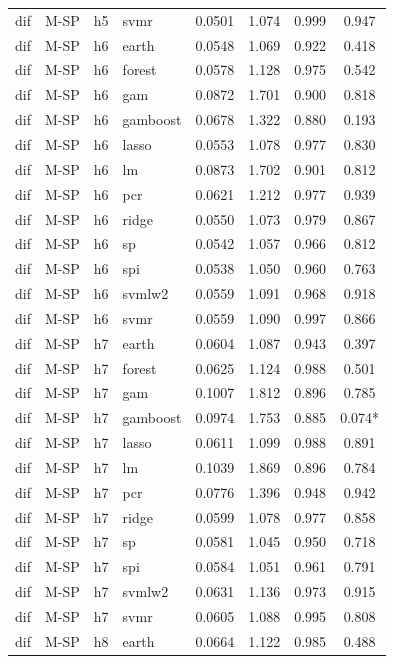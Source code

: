 \begin{ThreePartTable}
\begin{longtable}[t]{llclcccc}
dif & M-SP & h5 & svmr & 0.0501 & 1.074 & 0.999 & 0.947\\
\addlinespace
dif & M-SP & h6 & earth & 0.0548 & 1.069 & 0.922 & 0.418\\
dif & M-SP & h6 & forest & 0.0578 & 1.128 & 0.975 & 0.542\\
dif & M-SP & h6 & gam & 0.0872 & 1.701 & 0.900 & 0.818\\
dif & M-SP & h6 & gamboost & 0.0678 & 1.322 & 0.880 & 0.193\\
dif & M-SP & h6 & lasso & 0.0553 & 1.078 & 0.977 & 0.830\\
dif & M-SP & h6 & lm & 0.0873 & 1.702 & 0.901 & 0.812\\
dif & M-SP & h6 & pcr & 0.0621 & 1.212 & 0.977 & 0.939\\
dif & M-SP & h6 & ridge & 0.0550 & 1.073 & 0.979 & 0.867\\
dif & M-SP & h6 & sp & 0.0542 & 1.057 & 0.966 & 0.812\\
dif & M-SP & h6 & spi & 0.0538 & 1.050 & 0.960 & 0.763\\
dif & M-SP & h6 & svmlw2 & 0.0559 & 1.091 & 0.968 & 0.918\\
dif & M-SP & h6 & svmr & 0.0559 & 1.090 & 0.997 & 0.866\\
\addlinespace
dif & M-SP & h7 & earth & 0.0604 & 1.087 & 0.943 & 0.397\\
dif & M-SP & h7 & forest & 0.0625 & 1.124 & 0.988 & 0.501\\
dif & M-SP & h7 & gam & 0.1007 & 1.812 & 0.896 & 0.785\\
dif & M-SP & h7 & gamboost & 0.0974 & 1.753 & 0.885 & 0.074*\\
dif & M-SP & h7 & lasso & 0.0611 & 1.099 & 0.988 & 0.891\\
dif & M-SP & h7 & lm & 0.1039 & 1.869 & 0.896 & 0.784\\
dif & M-SP & h7 & pcr & 0.0776 & 1.396 & 0.948 & 0.942\\
dif & M-SP & h7 & ridge & 0.0599 & 1.078 & 0.977 & 0.858\\
dif & M-SP & h7 & sp & 0.0581 & 1.045 & 0.950 & 0.718\\
dif & M-SP & h7 & spi & 0.0584 & 1.051 & 0.961 & 0.791\\
dif & M-SP & h7 & svmlw2 & 0.0631 & 1.136 & 0.973 & 0.915\\
dif & M-SP & h7 & svmr & 0.0605 & 1.088 & 0.995 & 0.808\\
\addlinespace
dif & M-SP & h8 & earth & 0.0664 & 1.122 & 0.985 & 0.488\\

\end{longtable}
\end{ThreePartTable}
